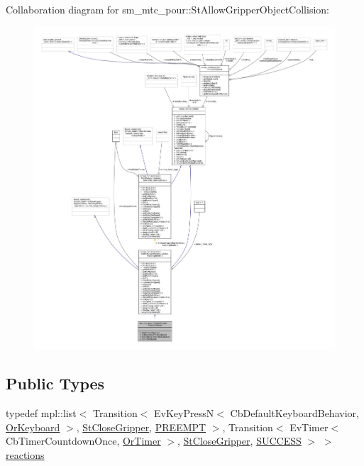Collaboration diagram for sm\+\_\+mtc\+\_\+pour\+:\+:St\+Allow\+Gripper\+Object\+Collision\+:
\nopagebreak
\begin{figure}[H]
\begin{center}
\leavevmode
\includegraphics[width=350pt]{structsm__mtc__pour_1_1StAllowGripperObjectCollision__coll__graph}
\end{center}
\end{figure}
\subsection*{Public Types}
\begin{DoxyCompactItemize}
\item 
typedef mpl\+::list$<$ Transition$<$ Ev\+Key\+PressN$<$ Cb\+Default\+Keyboard\+Behavior, \hyperlink{classsm__mtc__pour_1_1OrKeyboard}{Or\+Keyboard} $>$, \hyperlink{structsm__mtc__pour_1_1StCloseGripper}{St\+Close\+Gripper}, \hyperlink{classPREEMPT}{P\+R\+E\+E\+M\+PT} $>$, Transition$<$ Ev\+Timer$<$ Cb\+Timer\+Countdown\+Once, \hyperlink{classsm__mtc__pour_1_1OrTimer}{Or\+Timer} $>$, \hyperlink{structsm__mtc__pour_1_1StCloseGripper}{St\+Close\+Gripper}, \hyperlink{classSUCCESS}{S\+U\+C\+C\+E\+SS} $>$ $>$ \hyperlink{structsm__mtc__pour_1_1StAllowGripperObjectCollision_a697475a0c36bb52e64e92d8848b2b80a}{reactions}
\end{DoxyCompactItemize}
